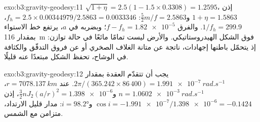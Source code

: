 \begin{solution}{exo:b3:gravity-geodesy:11}
$\sqrt{1 + \eta} = 2.5(1 - 1.5\times0.3308) = 1.2595$، إذن $1 + \eta = 1.5863$
و$\tfrac52m/f = 2.5863$: $f_h = 2.5\times0.00344979/2.5863 = \num{0.0033346}$،
$1/f_h = 299.9$. والفرق $f - f_h = \num{1.82e-5}$؛ وبضربه في $a$، يرتفع
خط الاستواء بمقدار \qty{116}{m} فوق الشكل الهيدروستاتيكي. والأرض ليست تمامًا
مائعًا في حالة توازن: إذ يتحمّل باطنها إجهادات، ناتجة عن متانة
الغلاف الصخري أو عن فروق التدفّق والكثافة في الوشاح، تحفظ
الشكل مبتعدًا عنه قليلًا.
\end{solution}

\begin{solution}{exo:b3:gravity-geodesy:12}
يجب أن تتقدّم العقدة بمقدار $2\pi/(365.242\times86\,400) =
\qty{1.991e-7}{rad.s^{-1}}$. عند $r = \qty{7078.137}{km}$، $n =
\qty{1.0602e-3}{rad.s^{-1}}$ و$\tfrac32nJ_2(a/r)^2 = \num{1.398e-6}$، إذن
$\cos i = -\num{1.991e-7}/\num{1.398e-6} = -0.1424$ و$i = \ang{98.2}$: مدار
قليل الارتداد، متزامن مع الشمس.
\end{solution}

